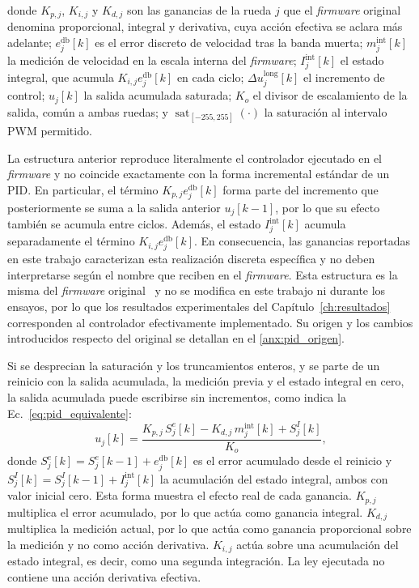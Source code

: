 \noindent donde $K_{p,j}$, $K_{i,j}$ y $K_{d,j}$ son las ganancias de la rueda $j$
que el \textit{firmware} original denomina proporcional, integral y derivativa, cuya
acción efectiva se aclara más adelante; $e_j^{\mathrm{db}}[k]$ es el
error discreto de velocidad tras la banda muerta; $m_j^{\mathrm{int}}[k]$ la
medición de velocidad en la escala interna del \textit{firmware}; $I_j^{\mathrm{int}}[k]$
el estado integral, que acumula $K_{i,j}e_j^{\mathrm{db}}[k]$ en cada ciclo;
$\Delta u_j^{\mathrm{long}}[k]$ el incremento de control; $u_j[k]$ la salida
acumulada saturada; $K_o$ el divisor de escalamiento de la salida, común a ambas
ruedas; y $\operatorname{sat}_{[-255,255]}(\cdot)$ la saturación al intervalo PWM
permitido.

La estructura anterior reproduce literalmente el controlador ejecutado en el
\textit{firmware} y no coincide exactamente con la forma incremental estándar de un PID. En
particular, el término $K_{p,j}e_j^{\mathrm{db}}[k]$ forma parte del incremento
que posteriormente se suma a la salida anterior $u_j[k-1]$, por lo que su
efecto también se acumula entre ciclos. Además, el estado
$I_j^{\mathrm{int}}[k]$ acumula separadamente el término
$K_{i,j}e_j^{\mathrm{db}}[k]$. En consecuencia, las ganancias reportadas en
este trabajo caracterizan esta realización discreta específica y no deben
interpretarse según el nombre que reciben en el \textit{firmware}. Esta estructura
es la misma del \textit{firmware} original~\citep{newans_rosarduinobridge,hbrobotics_rosarduinobridge}
y no se modifica en este trabajo ni durante los ensayos, por lo que los
resultados experimentales del Capítulo~\ref{ch:resultados} corresponden al
controlador efectivamente implementado. Su origen y los cambios introducidos
respecto del original se detallan en el \ref{anx:pid_origen}.

Si se desprecian la saturación y los truncamientos enteros, y se parte de un
reinicio con la salida acumulada, la medición previa y el estado integral en
cero, la salida acumulada puede escribirse sin incrementos, como indica la
Ec.~\eqref{eq:pid_equivalente}:
\begin{equation}
u_j[k]=\frac{K_{p,j}\,S_j^{e}[k]-K_{d,j}\,m_j^{\mathrm{int}}[k]+S_j^{I}[k]}{K_o},
\label{eq:pid_equivalente}
\end{equation}
\noindent donde $S_j^{e}[k]=S_j^{e}[k-1]+e_j^{\mathrm{db}}[k]$ es el error
acumulado desde el reinicio y $S_j^{I}[k]=S_j^{I}[k-1]+I_j^{\mathrm{int}}[k]$
la acumulación del estado integral, ambos con valor inicial cero. Esta forma
muestra el efecto real de cada ganancia. $K_{p,j}$ multiplica el error
acumulado, por lo que actúa como ganancia integral. $K_{d,j}$ multiplica la
medición actual, por lo que actúa como ganancia proporcional sobre la medición
y no como acción derivativa. $K_{i,j}$ actúa sobre una acumulación del estado
integral, es decir, como una segunda integración. La ley ejecutada no contiene
una acción derivativa efectiva.

